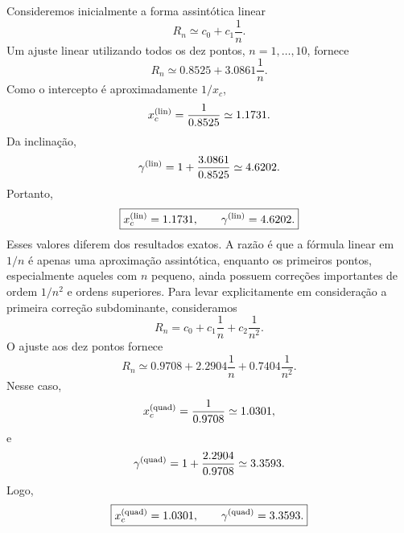 \documentclass[11pt,a4paper]{article}
\begin{document}
%
Consideremos inicialmente a forma assintótica linear
%
\begin{equation}
    R_n
    \simeq
    c_0+c_1\frac{1}{n}.
    \label{eq:fit_linear_p5}
\end{equation}
%
Um ajuste linear utilizando todos os dez pontos, $n=1,\ldots,10$,
fornece
%
\begin{equation}
    \boxed{
    R_n
    \simeq
    0.8525
    +
    3.0861\frac{1}{n}.
    }
\end{equation}
%
Como o intercepto é aproximadamente $1/x_c$,
%
\begin{equation}
    x_c^{\rm (lin)}
    =
    \frac{1}{0.8525}
    \simeq
    1.1731.
\end{equation}
%
Da inclinação,
%
\begin{equation}
    \gamma^{\rm (lin)}
    =
    1+\frac{3.0861}{0.8525}
    \simeq
    4.6202.
\end{equation}
%
Portanto,
%
\begin{equation}
    \boxed{
    x_c^{\rm (lin)}=1.1731,
    \qquad
    \gamma^{\rm (lin)}=4.6202.
    }
    \label{eq:linear_results_p5}
\end{equation}
%
Esses valores diferem dos resultados exatos. A razão é que a fórmula
linear em $1/n$ é apenas uma aproximação assintótica, enquanto os
primeiros pontos, especialmente aqueles com $n$ pequeno, ainda possuem
correções importantes de ordem $1/n^2$ e ordens superiores. Para levar explicitamente em consideração a primeira correção
subdominante, consideramos
%
\begin{equation}
    R_n
    =
    c_0
    +
    c_1\frac{1}{n}
    +
    c_2\frac{1}{n^2}.
    \label{eq:fit_quad_p5}
\end{equation}
%
O ajuste aos dez pontos fornece
%
\begin{equation}
    \boxed{
    R_n
    \simeq
    0.9708
    +
    2.2904\frac{1}{n}
    +
    0.7404\frac{1}{n^2}.
    }
\end{equation}
%
Nesse caso,
%
\begin{equation}
    x_c^{\rm (quad)}
    =
    \frac{1}{0.9708}
    \simeq
    1.0301,
\end{equation}
%
e
%
\begin{equation}
    \gamma^{\rm (quad)}
    =
    1+\frac{2.2904}{0.9708}
    \simeq
    3.3593.
\end{equation}
%
Logo,
%
\begin{equation}
    \boxed{
    x_c^{\rm (quad)}=1.0301,
    \qquad
    \gamma^{\rm (quad)}=3.3593.
    }
    \label{eq:quad_results_p5}
\end{equation}
\end{document}
